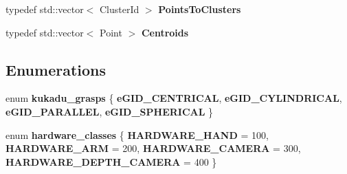 \begin{DoxyCompactItemize}
\item 
typedef std\+::vector$<$ Cluster\+Id $>$ {\bfseries Points\+To\+Clusters}\hypertarget{namespacekukadu_a5847dd1e58ac4746143040f0733890fc}{}\label{namespacekukadu_a5847dd1e58ac4746143040f0733890fc}

\item 
typedef std\+::vector$<$ Point $>$ {\bfseries Centroids}\hypertarget{namespacekukadu_a630f7f65e1f9c65949814a0cd297b182}{}\label{namespacekukadu_a630f7f65e1f9c65949814a0cd297b182}

\end{DoxyCompactItemize}
\subsection*{Enumerations}
\begin{DoxyCompactItemize}
\item 
enum {\bfseries kukadu\+\_\+grasps} \{ {\bfseries e\+G\+I\+D\+\_\+\+C\+E\+N\+T\+R\+I\+C\+AL}, 
{\bfseries e\+G\+I\+D\+\_\+\+C\+Y\+L\+I\+N\+D\+R\+I\+C\+AL}, 
{\bfseries e\+G\+I\+D\+\_\+\+P\+A\+R\+A\+L\+L\+EL}, 
{\bfseries e\+G\+I\+D\+\_\+\+S\+P\+H\+E\+R\+I\+C\+AL}
 \}\hypertarget{namespacekukadu_a011e64cfbcae5f66758797785169f798}{}\label{namespacekukadu_a011e64cfbcae5f66758797785169f798}

\item 
enum {\bfseries hardware\+\_\+classes} \{ {\bfseries H\+A\+R\+D\+W\+A\+R\+E\+\_\+\+H\+A\+ND} = 100, 
{\bfseries H\+A\+R\+D\+W\+A\+R\+E\+\_\+\+A\+RM} = 200, 
{\bfseries H\+A\+R\+D\+W\+A\+R\+E\+\_\+\+C\+A\+M\+E\+RA} = 300, 
{\bfseries H\+A\+R\+D\+W\+A\+R\+E\+\_\+\+D\+E\+P\+T\+H\+\_\+\+C\+A\+M\+E\+RA} = 400
 \}\hypertarget{namespacekukadu_ab1f57b64308d0ea688ad27ea0814b9c9}{}\label{namespacekukadu_ab1f57b64308d0ea688ad27ea0814b9c9}

\end{DoxyCompactItemize}
